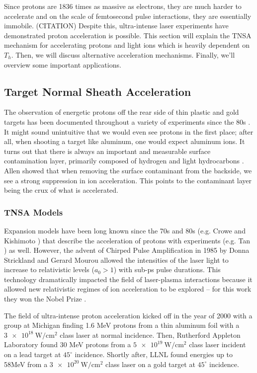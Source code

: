 Since protons are 1836 times as massive as electrons, they are much harder to accelerate and on the scale of femtosecond pulse interactions, they are essentially immobile. (CITATION) Despite this, ultra-intense laser experiments have demonstrated proton acceleration is possible. This section will explain the \gls{TNSA} mechanism for accelerating protons and light ions which is heavily dependent on $T_h$. Then, we will discuss alternative acceleration mechanisms. Finally, we'll overview some important applications.

\subsection{Target Normal Sheath Acceleration}
The observation of energetic protons off the rear side of thin plastic and gold targets has been documented throughout a variety of experiments since the 80s \cite{Tan_1984_PoF}. It might sound unintuitive that we would even see protons in the first place; after all, when shooting a target like aluminum, one would expect aluminum ions. It turns out that there is always an important and measurable surface contamination layer, primarily composed of hydrogen and light hydrocarbons \cite{Gitomer_1986_PoF}. Allen \cite{Allen_2004_PRL} showed that when removing the surface contaminant from the backside, we see a strong suppression in ion acceleration. This points to the contaminant layer being the crux of what is accelerated.

\subsubsection{TNSA Models}

Expansion models have been long known since the 70s and 80s (e.g. Crowe \cite{Crow_1975_JPP} and Kishimoto \cite{Kishimoto_1983_PoF}) that describe the acceleration of protons with experiments (e.g. Tan \cite{Tan_1984_PoF}) as well. However, the advent of Chirped Pulse Amplification \cite{Strickland_1985_Optics} in 1985 by Donna Strickland and Gerard Mourou allowed the intensities of the laser light to increase to relativistic levels ($a_0 > 1$) with sub-ps pulse durations. This technology dramatically impacted the field of laser-plasma interactions because it allowed new relativistic regimes of ion acceleration to be explored -- for this work they won the Nobel Prize \cite{Nobel_2018}. 

The field of ultra-intense proton acceleration kicked off in the year of 2000 with a group at Michigan \cite{Maksimchuk_2000_PRL} finding 1.6 MeV protons from a thin aluminum foil with a $\SI{3e18}{\watt \per \centi \meter \squared}$ class laser at normal incidence. Then, Rutherford Appleton Laboratory found 30 MeV protons \cite{Clark_2000_PRL} from a $\SI{5e19}{\watt \per \centi \meter \squared}$ class laser incident on a lead target at $45^\circ$ incidence. Shortly after, \gls{LLNL} found energies up to 58MeV \cite{Snavely_2000_PRL} from a $\SI{3e20}{\watt \per \centi \meter \squared}$ class laser on a gold target at $45^\circ$ incidence.

